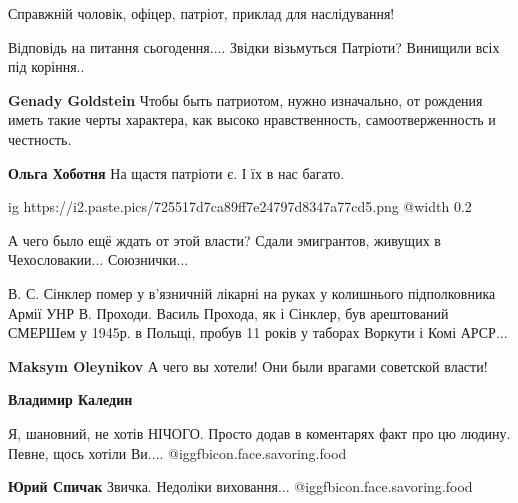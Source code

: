  
 
 
 
 
\zzSecCmt

\begin{itemize} %
Справжній чоловік, офіцер, патріот, приклад для наслідування!

Відповідь на питання сьогодення....
Звідки візьмуться Патріоти?
Винищили всіх під коріння..

\begin{itemize} %
\textbf{Genady Goldstein} Чтобы быть патриотом, нужно изначально, от рождения иметь такие черты характера, как высоко нравственность, самоотверженность и честность.

\textbf{Ольга Хоботня} На щастя патріоти є. І їх в нас багато.
\end{itemize} %


\ifcmt
  ig https://i2.paste.pics/725517d7ca89ff7e24797d8347a77cd5.png
  @width 0.2
\fi

А чего было ещё ждать от этой власти?
Сдали эмигрантов, живущих в Чехословакии...
Союзнички...


В. С. Сінклер помер у в'язничній лікарні на руках у колишнього підполковника
Армії УНР В. Проходи. Василь Прохода, як і Сінклер, був арештований СМЕРШем у
1945р. в Польщі, пробув 11 років у таборах Воркути і Комі АРСР...

\begin{itemize} %
\textbf{Maksym Oleynikov} А чего вы хотели! Они были врагами советской власти!

\textbf{Владимир Каледин} 

Я, шановний, не хотів НІЧОГО. Просто додав в коментарях факт про цю людину.
Певне, щось хотіли Ви.... @igg{fbicon.face.savoring.food} 

\textbf{Юрий Спичак} Звичка. Недоліки виховання... @igg{fbicon.face.savoring.food} 
\end{itemize} %


\end{itemize}
